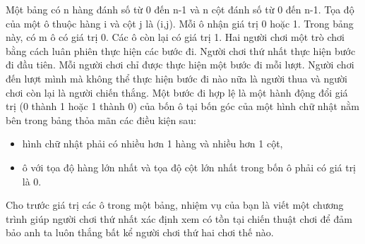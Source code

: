 Một bảng có n hàng đánh số từ 0 đến n-1 và n cột đánh số từ 0 đến n-1. Tọa độ của một ô thuộc hàng i và cột  j là (i,j). Mỗi ô nhận giá trị 0 hoặc 1. Trong bảng này, có m ô có giá trị 0. Các ô còn lại có giá trị 1. Hai người chơi một trò chơi bằng cách luân phiên thực hiện các bước đi. Người chơi thứ nhất thực hiện bước đi đầu tiên. Mỗi người chơi chỉ được thực hiện một bước đi mỗi lượt. Người chơi đến lượt mình mà không thể thực hiện bước đi nào nữa là người thua và người chơi còn lại là người chiến thắng. Một bước đi hợp lệ là một hành động đổi giá trị (0 thành 1 hoặc 1 thành 0) của bốn ô tại bốn góc của một hình chữ nhật nằm bên trong bảng thỏa mãn các điều kiện sau:  
\begin{itemize}
	\item     hình chữ nhật phải có nhiều hơn 1 hàng và nhiều hơn 1 cột,   
	\item     ô với tọa độ hàng lớn nhất và tọa độ cột lớn nhất trong bốn ô phải có giá trị là 0.   
\end{itemize}

   Cho trước giá trị các ô trong một bảng, nhiệm vụ của bạn là viết một chương trình giúp người chơi thứ nhất xác định xem có tồn tại chiến thuật chơi để đảm bảo anh ta luôn thắng bất kể người chơi thứ hai chơi thế nào.